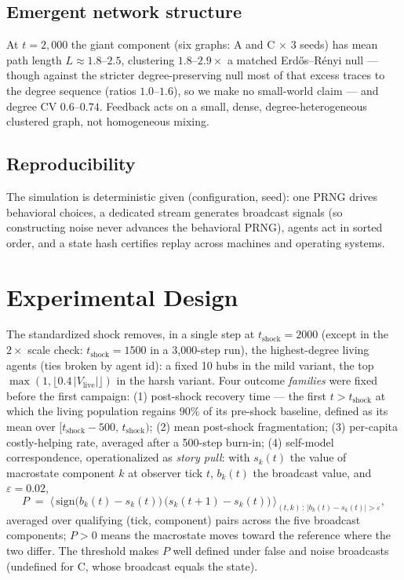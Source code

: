 \documentclass{svproc}
\begin{document}
\subsection{Emergent network structure}
At $t=2{,}000$ the giant component (six graphs: A and C $\times$ 3 seeds) has
mean path length $L\approx1.8$--$2.5$, clustering $1.8$--$2.9\times$ a matched
Erd\H{o}s--R\'enyi null --- though against the stricter degree-preserving null
most of that excess traces to the degree sequence (ratios $1.0$--$1.6$), so we
make no small-world claim --- and degree CV $0.6$--$0.74$. Feedback acts on a
small, dense, degree-heterogeneous clustered graph, not homogeneous mixing.

\subsection{Reproducibility}
The simulation is deterministic given (configuration, seed): one PRNG drives
behavioral choices, a dedicated stream generates broadcast signals (so
constructing noise never advances the behavioral PRNG), agents act in sorted
order, and a state hash certifies replay across machines and operating systems.

\section{Experimental Design}
The standardized shock removes, in a single step at $t_{\mathrm{shock}}=2000$
(except in the $2\times$ scale check: $t_{\mathrm{shock}}=1500$ in a
3{,}000-step run), the
highest-degree living agents (ties broken by agent id): a fixed 10 hubs in
the mild variant, the top $\max(1, \lfloor 0.4\,|V_{\mathrm{live}}|\rfloor)$ in the
harsh variant. Four outcome \emph{families} were fixed before the first
campaign: (1) post-shock recovery time --- the first $t > t_{\mathrm{shock}}$
at which the living population regains $90\%$ of its pre-shock baseline,
defined as its mean over $[t_{\mathrm{shock}}{-}500,\, t_{\mathrm{shock}})$;
(2) mean post-shock fragmentation; (3) per-capita costly-helping rate,
averaged after a 500-step burn-in; (4)
self-model correspondence, operationalized as \emph{story pull}: with
$s_k(t)$ the value of macrostate component $k$ at observer tick $t$,
$b_k(t)$ the broadcast value, and $\varepsilon=0.02$,
\begin{equation}
P \;=\; \Big\langle\, \mathrm{sign}\big(b_k(t)-s_k(t)\big)\,
\big(s_k(t{+}1)-s_k(t)\big) \,\Big\rangle_{(t,k)\,:\,|b_k(t)-s_k(t)|>\varepsilon},
\label{eq:pull}
\end{equation}
averaged over qualifying (tick, component) pairs across the five broadcast
components; $P>0$ means the macrostate moves toward the reference where the
two differ. The threshold makes $P$ well defined under false and noise
broadcasts (undefined for C, whose broadcast equals the state).
\end{document}
